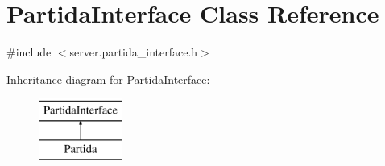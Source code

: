 \hypertarget{classPartidaInterface}{\section{Partida\-Interface Class Reference}
\label{classPartidaInterface}
}


{\ttfamily \#include $<$server.\-partida\-\_\-interface.\-h$>$}

Inheritance diagram for Partida\-Interface\-:\begin{figure}[H]
\begin{center}
\leavevmode
\includegraphics[height=2.000000cm]{classPartidaInterface}
\end{center}
\end{figure}
